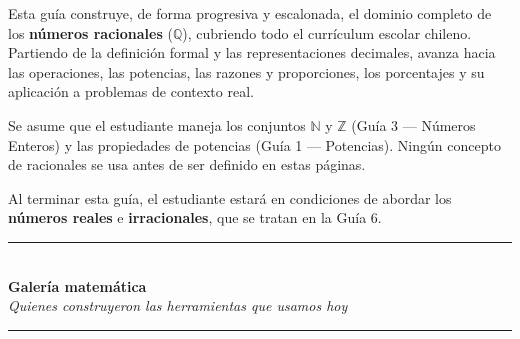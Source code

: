 \documentclass[11pt, letterpaper]{article}
\begin{document}
\begin{tcolorbox}[importantbox, title={Prop\'osito de la gu\'ia}]
Esta gu\'ia construye, de forma progresiva y escalonada, el dominio completo de los \textbf{n\'umeros racionales} ($\mathbb{Q}$), cubriendo todo el curr\'iculum escolar chileno. Partiendo de la definici\'on formal y las representaciones decimales, avanza hacia las operaciones, las potencias, las razones y proporciones, los porcentajes y su aplicaci\'on a problemas de contexto real.

\medskip

Se asume que el estudiante maneja los conjuntos $\mathbb{N}$ y $\mathbb{Z}$ (Gu\'ia 3 --- N\'umeros Enteros) y las propiedades de potencias (Gu\'ia 1 --- Potencias). Ning\'un concepto de racionales se usa antes de ser definido en estas p\'aginas.

\medskip

Al terminar esta gu\'ia, el estudiante estar\'a en condiciones de abordar los \textbf{n\'umeros reales} e \textbf{irracionales}, que se tratan en la Gu\'ia 6.
\end{tcolorbox}

\clearpage
\thispagestyle{empty}
\label{sec:galeria}

\begin{center}
  \vspace*{0.4cm}
  \textcolor{zenitnavy}{\rule{0.72\linewidth}{1.2pt}}\\[0.5cm]
  {\Large\bfseries\color{zenitnavy} Galer\'ia matem\'atica}\\[0.15cm]
  {\normalsize\itshape\color{zenitgold} Quienes construyeron las herramientas que usamos hoy}\\[0.4cm]
  \textcolor{zenitnavy}{\rule{0.72\linewidth}{0.6pt}}
\end{center}

\vspace{0.6cm}
\end{document}
